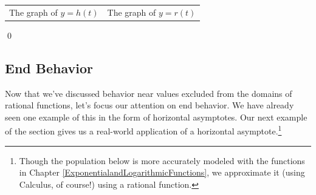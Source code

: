 \begin{ex}
\begin{enumerate}
\begin{center}
\begin{tabular}{cc}
The graph of $y=h(t)$  \hspace{0.75in} & The graph of $y=r(t)$ \\


\end{tabular}
\end{center} 

\end{enumerate}
\qed
\end{ex}

\subsection{End Behavior}
\label{ebrationalsection}

Now that we've  discussed behavior near values excluded from the domains of rational functions, let's focus our attention on  end behavior.  We have already seen one example of this in the form of horizontal asymptotes.  Our next example of the section gives us a real-world application of a horizontal asymptote.\footnote{Though the population below is more accurately modeled with the functions in Chapter \ref{ExponentialandLogarithmicFunctions}, we approximate it (using Calculus, of course!) using a rational function.}

